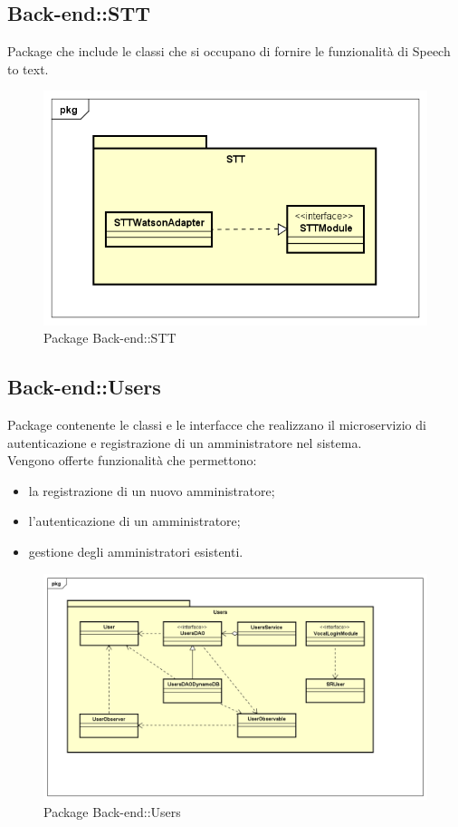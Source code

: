 \subsection{Back-end::STT}
Package che include le classi che si occupano di fornire le funzionalità di Speech to text.
\begin{figure}[h] \centering \includegraphics[width=\textwidth,height=\textheight,keepaspectratio]{images/diagrams/back-end/Official_Backend_0304/STT.png}
\caption{Package Back-end::STT}
\end{figure}
\newpage

\subsection{Back-end::Users}
Package contenente le classi e le interfacce che realizzano il microservizio di autenticazione e registrazione di un amministratore nel sistema.\\ Vengono offerte funzionalità che permettono: \begin{itemize} \item la registrazione di un nuovo amministratore; \item l'autenticazione di un amministratore; \item gestione degli amministratori esistenti. \end{itemize}
\begin{figure}[h] \centering \includegraphics[width=\textwidth,height=\textheight,keepaspectratio]{images/diagrams/back-end/Official_Backend_0304/Users.png}
\caption{Package Back-end::Users}
\end{figure}
\newpage

